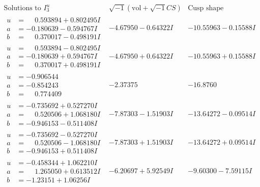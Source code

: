 \documentclass[1p]{elsarticle_modified}
\theoremstyle{definition}
\newcommand{\I}{\sqrt{-1}}
\begin{document}
$$\begin{array}{c|c|c}  
\text{Solutions to }I^u_{3}& \I (\text{vol} + \sqrt{-1}CS) & \text{Cusp shape}\\
 \hline 
\begin{aligned}
u &= \phantom{-}0.593894 + 0.802495 I \\
a &= -0.180639 - 0.594767 I \\
b &= \phantom{-}0.370017 - 0.498191 I\end{aligned}
 & -4.67950 - 0.64322 I & -10.55963 - 0.15588 I \\ \hline\begin{aligned}
u &= \phantom{-}0.593894 - 0.802495 I \\
a &= -0.180639 + 0.594767 I \\
b &= \phantom{-}0.370017 + 0.498191 I\end{aligned}
 & -4.67950 + 0.64322 I & -10.55963 + 0.15588 I \\ \hline\begin{aligned}
u &= -0.906544\phantom{ +0.000000I} \\
a &= -0.854243\phantom{ +0.000000I} \\
b &= \phantom{-}0.774409\phantom{ +0.000000I}\end{aligned}
 & -2.37375\phantom{ +0.000000I} & -16.8760\phantom{ +0.000000I} \\ \hline\begin{aligned}
u &= -0.735692 + 0.527270 I \\
a &= \phantom{-}0.520506 + 1.068180 I \\
b &= -0.946153 - 0.511408 I\end{aligned}
 & -7.87303 - 1.51903 I & -13.64272 - 0.09514 I \\ \hline\begin{aligned}
u &= -0.735692 - 0.527270 I \\
a &= \phantom{-}0.520506 - 1.068180 I \\
b &= -0.946153 + 0.511408 I\end{aligned}
 & -7.87303 + 1.51903 I & -13.64272 + 0.09514 I \\ \hline\begin{aligned}
u &= -0.458344 + 1.062210 I \\
a &= \phantom{-}1.265050 + 0.613512 I \\
b &= -1.23151 + 1.06256 I\end{aligned}
 & -6.20697 + 5.92549 I & -9.60300 - 7.59115 I \\ \hline\begin{aligned}

\end{aligned}
\end{array}$$
\end{document}
